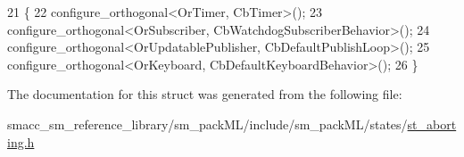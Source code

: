 \begin{DoxyCode}
21     \{
22         configure\_orthogonal<OrTimer, CbTimer>();   
23         configure\_orthogonal<OrSubscriber, CbWatchdogSubscriberBehavior>();
24         configure\_orthogonal<OrUpdatablePublisher, CbDefaultPublishLoop>();
25         configure\_orthogonal<OrKeyboard, CbDefaultKeyboardBehavior>();
26     \}
\end{DoxyCode}


The documentation for this struct was generated from the following file\+:\begin{DoxyCompactItemize}
\item 
smacc\+\_\+sm\+\_\+reference\+\_\+library/sm\+\_\+pack\+M\+L/include/sm\+\_\+pack\+M\+L/states/\hyperlink{st__aborting_8h}{st\+\_\+aborting.\+h}\end{DoxyCompactItemize}
